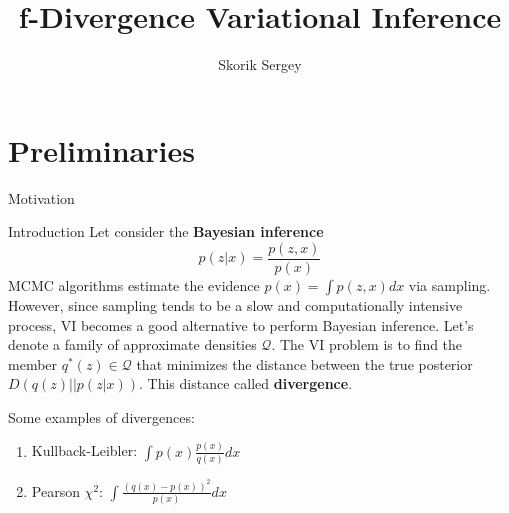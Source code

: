 \documentclass{beamer}
\title{f-Divergence Variational Inference}
\author{Skorik Sergey}
\institute{MIPT, 2022}
\begin{document}
\begin{frame}
    \titlepage
\end{frame}


\begin{frame}
    \tableofcontents
\end{frame}

\section{Preliminaries}

\begin{frame}{Motivation}
    \begin{block}{Introduction}
        Let consider the \textbf{Bayesian inference}
        $$p(z|x) = \dfrac{p(z,x)}{p(x)}$$
        MCMC algorithms estimate the evidence $p(x) = \int p(z, x) dx$ via sampling. However, since sampling tends to be a slow and computationally intensive process, VI becomes a good alternative to perform Bayesian inference. Let's denote a family of approximate densities $\mathcal{Q}$. The VI problem is to find the member $q^*(z) \in \mathcal{Q}$ that minimizes the distance between the true posterior $D(q(z) || p(z|x))$. This distance called \textbf{divergence}. 

        Some examples of divergences:
        \begin{enumerate}
            \item Kullback-Leibler: $\int p(x) \frac{p(x)}{q(x)}dx$
            \item Pearson $\chi^2$: $\int \frac{(q(x) - p(x))^2}{p(x)}dx$
        \end{enumerate}
    \end{block}
\end{frame}
\end{document}
